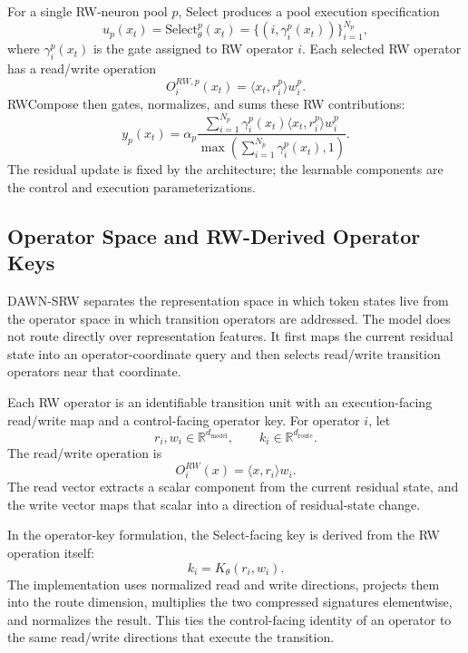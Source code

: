 \documentclass{article}
\begin{document}
For a single RW-neuron pool \(p\), Select produces a pool execution specification
\begin{equation}
    u_p(x_t)=\mathrm{Select}^p_\theta(x_t)=\{(i,\gamma_i^p(x_t))\}_{i=1}^{N_p},
\end{equation}
where \(\gamma_i^p(x_t)\) is the gate assigned to RW operator \(i\). Each selected RW operator has a read/write operation
\begin{equation}
    O_i^{RW,p}(x_t)=\langle x_t,r_i^p\rangle w_i^p .
\end{equation}
RWCompose then gates, normalizes, and sums these RW contributions:
\begin{equation}
    y_p(x_t)=
    \alpha_p
    \frac{\sum_{i=1}^{N_p}\gamma_i^p(x_t)\langle x_t,r_i^p\rangle w_i^p}
    {\max\left(\sum_{i=1}^{N_p}\gamma_i^p(x_t),1\right)} .
    \label{eq:method_rwcompose_compact}
\end{equation}
The residual update is fixed by the architecture; the learnable components are the control and execution parameterizations.

\subsection{Operator Space and RW-Derived Operator Keys}

DAWN-SRW separates the representation space in which token states live from the operator space in which transition operators are addressed. The model does not route directly over representation features. It first maps the current residual state into an operator-coordinate query and then selects read/write transition operators near that coordinate.

Each RW operator is an identifiable transition unit with an execution-facing read/write map and a control-facing operator key. For operator \(i\), let
\begin{equation}
    r_i,w_i\in\mathbb{R}^{d_{\mathrm{model}}},\qquad k_i\in\mathbb{R}^{d_{\mathrm{route}}}.
\end{equation}
The read/write operation is
\begin{equation}
    O_i^{RW}(x)=\langle x,r_i\rangle w_i .
    \label{eq:method_rw_operator}
\end{equation}
The read vector extracts a scalar component from the current residual state, and the write vector maps that scalar into a direction of residual-state change.

In the operator-key formulation, the Select-facing key is derived from the RW operation itself:
\begin{equation}
    k_i = K_\theta(r_i,w_i).
    \label{eq:method_rw_derived_key}
\end{equation}
The implementation uses normalized read and write directions, projects them into the route dimension, multiplies the two compressed signatures elementwise, and normalizes the result. This ties the control-facing identity of an operator to the same read/write directions that execute the transition.
\end{document}

